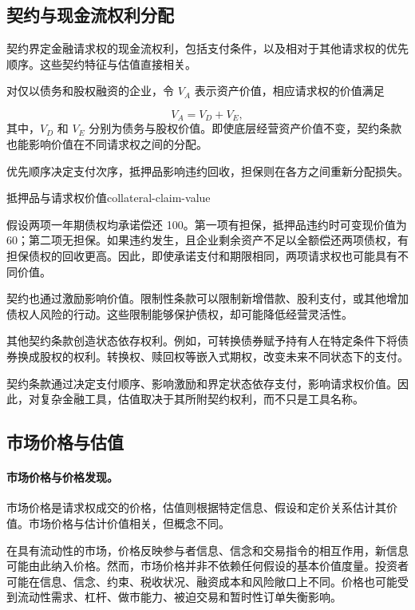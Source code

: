 \subsection{契约与现金流权利分配}

契约界定金融请求权的现金流权利，包括支付条件，以及相对于其他请求权的优先顺序。这些契约特征与估值直接相关。

对仅以债务和股权融资的企业，令 $V_A$ 表示资产价值，相应请求权的价值满足

\begin{equation}
V_A=V_D+V_E,
\label{eq:ch5-value-allocation}
\end{equation}
其中，$V_D$ 和 $V_E$ 分别为债务与股权价值。即使底层经营资产价值不变，契约条款也能影响价值在不同请求权之间的分配。

优先顺序决定支付次序，抵押品影响违约回收，担保则在各方之间重新分配损失。

\begin{example}{抵押品与请求权价值}{collateral-claim-value}


假设两项一年期债权均承诺偿还 100。第一项有担保，抵押品违约时可变现价值为 60；第二项无担保。如果违约发生，且企业剩余资产不足以全额偿还两项债权，有担保债权的回收更高。因此，即使承诺支付和期限相同，两项请求权也可能具有不同价值。

\end{example}

契约也通过激励影响价值。限制性条款可以限制新增借款、股利支付，或其他增加债权人风险的行动。这些限制能够保护债权，却可能降低经营灵活性。

其他契约条款创造状态依存权利。例如，可转换债券赋予持有人在特定条件下将债券换成股权的权利。转换权、赎回权等嵌入式期权，改变未来不同状态下的支付。

契约条款通过决定支付顺序、影响激励和界定状态依存支付，影响请求权价值。因此，对复杂金融工具，估值取决于其所附契约权利，而不只是工具名称。

\subsection{市场价格与估值}

\paragraph{市场价格与价格发现。}
市场价格是请求权成交的价格，估值则根据特定信息、假设和定价关系估计其价值。市场价格与估计价值相关，但概念不同。

在具有流动性的市场，价格反映参与者信息、信念和交易指令的相互作用，新信息可能由此纳入价格。然而，市场价格并非不依赖任何假设的基本价值度量。投资者可能在信息、信念、约束、税收状况、融资成本和风险敞口上不同。价格也可能受到流动性需求、杠杆、做市能力、被迫交易和暂时性订单失衡影响。

